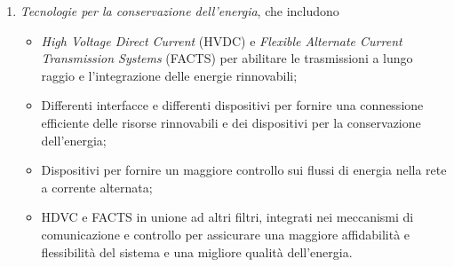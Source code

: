 \begin{enumerate}
\begin{itemize}
	\end{itemize}
\item \textit{Tecnologie per la conservazione dell'energia}, che includono
	\begin{itemize}
	\item \textit{High Voltage Direct Current} (HVDC) e \textit{Flexible Alternate Current Transmission Systems} (FACTS) per abilitare le trasmissioni a lungo raggio e l'integrazione delle energie rinnovabili;
	\item Differenti interfacce e differenti dispositivi per fornire una connessione efficiente delle risorse rinnovabili e dei dispositivi per la conservazione dell'energia;
	\item Dispositivi per fornire un maggiore controllo sui flussi di energia nella rete a corrente alternata;
	\item  HDVC e FACTS in unione ad altri filtri, integrati nei meccanismi di comunicazione e controllo per assicurare una maggiore affidabilità e flessibilità del sistema e una migliore qualità dell'energia.
	\end{itemize}
\end{enumerate}